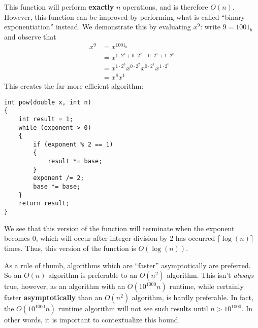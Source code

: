 \documentclass[a4paper]{article}
\begin{document}
This function will perform \textbf{exactly} $n$ operations, and is therefore $O(n)$. However, this function can be improved by performing what is called ``binary exponentiation'' instead. We demonstrate this by evaluating $x^9$: write $9=1001_b$ and observe that\begin{align*}x^9&=x^{1001_b}\\&=x^{1\cdot2^3+0\cdot2^2+0\cdot2^1+1\cdot2^0}\\&=x^{1\cdot2^3}x^{0\cdot2^2}x^{0\cdot2^1}x^{1\cdot2^0}\\&=x^8x^1\end{align*} This creates the far more efficient algorithm:

\begin{verbatim}
int pow(double x, int n)
{
	int result = 1;
	while (exponent > 0)
	{
		if (exponent % 2 == 1)
		{
			result *= base;
		}
		exponent /= 2;
		base *= base;
	}
	return result;
}
\end{verbatim}

We see that this version of the function will terminate when the exponent becomes 0, which will occur after integer division by 2 has occurred $\lceil\log(n)\rceil$ times. Thus, this version of the function is $O(\log(n))$.

As a rule of thumb, algorithms which are ``faster'' asymptotically are preferred. So an $O(n)$ algorithm is preferable to an $O(n^2)$ algorithm. This isn't \textit{always} true, however, as an algorithm with an $O(10^{1000}n)$ runtime, while certainly faster \textbf{asymptotically} than an $O(n^2)$ algorithm, is hardly preferable. In fact, the $O(10^{1000}n)$ runtime algorithm will not see such results until $n>10^{1000}$. In other words, it is important to contextualize this bound.
\end{document}
